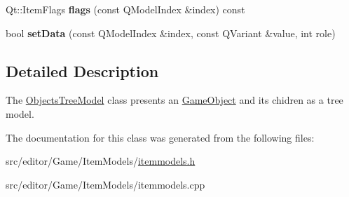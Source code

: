 \begin{DoxyCompactItemize}
\item 
\hypertarget{class_objects_tree_model_a7cbd6321c7f581a088d0e93418724898}{\-Qt\-::\-Item\-Flags {\bfseries flags} (const \-Q\-Model\-Index \&index) const }\label{class_objects_tree_model_a7cbd6321c7f581a088d0e93418724898}

\item 
\hypertarget{class_objects_tree_model_a33316c0c59125afb510d7df5d62784a4}{bool {\bfseries set\-Data} (const \-Q\-Model\-Index \&index, const \-Q\-Variant \&value, int role)}\label{class_objects_tree_model_a33316c0c59125afb510d7df5d62784a4}

\end{DoxyCompactItemize}


\subsection{\-Detailed \-Description}
\-The \hyperlink{class_objects_tree_model}{\-Objects\-Tree\-Model} class presents an \hyperlink{class_game_object}{\-Game\-Object} and its chidren as a tree model. 

\-The documentation for this class was generated from the following files\-:\begin{DoxyCompactItemize}
\item 
src/editor/\-Game/\-Item\-Models/\hyperlink{itemmodels_8h}{itemmodels.\-h}\item 
src/editor/\-Game/\-Item\-Models/itemmodels.\-cpp\end{DoxyCompactItemize}

